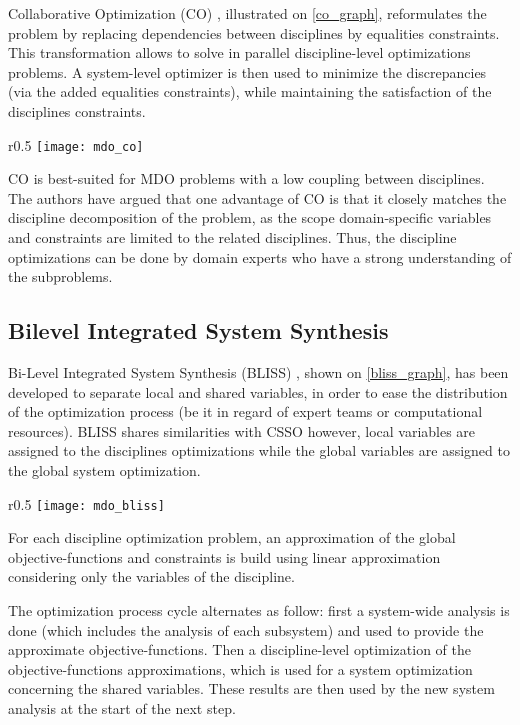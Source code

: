 Collaborative Optimization (CO) \cite{Ilan:1994:MOM:887207}, illustrated on \figurename{} \ref{co_graph}, reformulates the problem by replacing dependencies between disciplines by equalities constraints. This transformation allows to solve in parallel discipline-level optimizations problems. A system-level optimizer is then used to minimize the discrepancies (via the added equalities constraints), while maintaining the satisfaction of the disciplines constraints.

\begin{wrapfigure}{r}{0.5\textwidth}
\centering
\texttt{[image: mdo\_co]}
\caption{CO method}\label{co_graph}
\end{wrapfigure}

CO is best-suited for MDO problems with a low coupling between disciplines. The authors have argued that one advantage of CO is that it closely matches the discipline decomposition of the problem, as the scope domain-specific variables and constraints are limited to the related disciplines. Thus, the discipline optimizations can be done by domain experts  who have a strong understanding of the subproblems.

\subsection{Bilevel Integrated System Synthesis}

Bi-Level Integrated System Synthesis (BLISS) \cite{J.:1998:BIS:886310}, shown on \figurename{} \ref{bliss_graph}, has been developed to separate local and shared variables, in order to ease the distribution of the optimization process (be it in regard of expert teams or computational resources).
BLISS shares similarities with CSSO however, local variables are assigned to the disciplines optimizations while the global variables are assigned to the global system optimization.

\begin{wrapfigure}{r}{0.5\textwidth}
\centering
\texttt{[image: mdo\_bliss]}
\caption{BLISS method}\label{bliss_graph}
\end{wrapfigure}

For each discipline optimization problem, an approximation of the global objective-functions and constraints is build using linear approximation considering only the variables of the discipline.

The optimization process cycle alternates as follow: first a system-wide analysis is done (which includes the analysis of each subsystem) and used to provide the approximate objective-functions. Then a discipline-level optimization of the objective-functions approximations, which is used for a system optimization concerning the shared variables. These results are then used by the new system analysis at the start of the next step.
   
